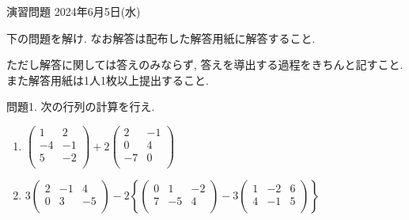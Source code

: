 \documentclass[dvipdfmx,a4paper,11pt]{article}
\theoremstyle{definition}
\begin{document}
\pagestyle{empty}



\begin{center}
{\Large 演習問題 2024年6月5日(水)} \\

\end{center}


\begin{center}
 {\large 下の問題を解け. なお解答は配布した解答用紙に解答すること.}
  \end{center}
 ただし解答に関しては答えのみならず, 答えを導出する過程をきちんと記すこと. 
 また解答用紙は1人1枚以上提出すること.
  
  \vspace{11pt}
 問題1. 次の行列の計算を行え.
 
 \begin{enumerate}
   \setlength{\parskip}{0cm} %
  \setlength{\itemsep}{0cm} %
 \item $
 \begin{pmatrix}
 1 &2 \\
 -4&-1\\
  5&-2\\
 \end{pmatrix}
 + 2
 \begin{pmatrix}
 2 &-1 \\
  0&4\\
  -7&0\\
 \end{pmatrix}
 $
 \item $
3 \begin{pmatrix}
 2 &-1&4 \\
 0&3&-5\\
 \end{pmatrix}
 - 2
 \left\{
 \begin{pmatrix}
 0 &1&-2 \\
 7&-5&4\\
 \end{pmatrix}
 - 3
  \begin{pmatrix}
 1 &-2&6 \\
 4&-1&5\\
 \end{pmatrix}
\right\}
 $

 \end{enumerate}
 
\end{document}
